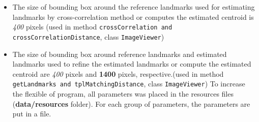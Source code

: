 \begin{itemize}
\begin{itemize}
	\end{itemize}
\item The size of bounding box around the reference landmarks used for estimating landmarks by cross-correlation method or computes the estimated centroid is \textit{400} pixels (used in method \texttt{crossCorrelation and crossCorrelationDistance}, class \texttt{ImageViewer})
\item The size of bounding box around reference landmarks and estimated landmarks used to refine the estimated landmarks or compute the estimated centroid are \textit{400} pixels and \textbf{1400} pixels, respective.(used in method \texttt{getLandmarks and tplMatchingDistance}, class \texttt{ImageViewer})
To increase the flexible of program, all parameters was placed in the resources files (\textbf{data/resources} folder). For each group of parameters, the parameters are put in a file.
\end{itemize}
